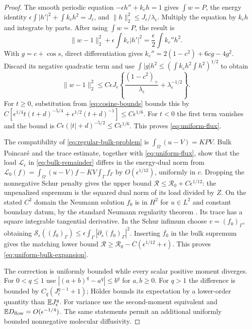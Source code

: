 \begin{proof}
The smooth periodic equation $-\epsilon h''+k_ch=1$ gives
$\int w=P$, the energy identity
$\epsilon\int|h'|^2+\int k_ch^2=J_\epsilon$, and
$\|h\|_2^2\le J_\epsilon/\lambda_\epsilon$.
Multiply the equation by $k_ch$ and integrate by parts. After using
$\int w=P$, the result is
\begin{equation}\label{eq:flux-identity}
 \|w-1\|_2^2+\epsilon\int k_c|h'|^2
                  =\frac\epsilon2\int k_c''h^2.
\end{equation}
With $g=c+\cos s$, direct differentiation gives
$k_c''=2(1-c^2)+6cg-4g^2$.
Discard its negative quadratic term and use
$\int|g|h^2\le(\int k_ch^2\int h^2)^{1/2}$ to obtain
\[
 \|w-1\|_2^2\le C\epsilon J_\epsilon
    \left\{\frac{(1-c^2)_+}{\lambda_\epsilon}
                                +\lambda_\epsilon^{-1/2}\right\}.
\]
For $t\ge0$, substitution from \eqref{eq:cosine-bounds} bounds this by
$C[\epsilon^{1/4}t(t+d)^{-5/4}+\epsilon^{1/2}(t+d)^{-1}]
\le C\epsilon^{1/6}$. For $t<0$ the first term vanishes and the
bound is $C\epsilon(|t|+d)^{-5/2}\le C\epsilon^{1/6}$.
This proves \eqref{eq:uniform-flux}.

The compatibility of \eqref{eq:regular-bulk-problem} is
$\int_\Omega(u-V)=KPV$. Bulk Poincar\'e and the trace estimate,
together with \eqref{eq:uniform-flux}, show that the load
$\mathcal L_\epsilon$ in \eqref{eq:bulk-remainder} differs in the
energy-dual norm from
$\mathcal L_0(f)=\int_\Omega(u-V)f-KV\int_\Gamma f_\Gamma$
by $O(\epsilon^{1/12})$, uniformly in $c$.
Dropping the nonnegative Schur penalty gives the upper bound
$\mathcal R\le\mathcal R_0+C\epsilon^{1/12}$: the unpenalized
supremum is the squared dual norm of its load divided by $Z$.
On the stated $C^2$ domain the Neumann solution $f_0$ is in $H^2$
for $u\in L^2$ and constant boundary datum, by the standard Neumann
regularity theorem \citep[Section~2.4]{Grisvard2011}. Its trace has a square
integrable tangential derivative. In the Schur infimum choose
$v=(f_0)_\Gamma$, obtaining
$\mathcal S_\epsilon((f_0)_\Gamma)
 \le\epsilon\int_\Gamma|\partial_s(f_0)_\Gamma|^2$.
Inserting $f_0$ in the bulk supremum gives the matching lower bound
$\mathcal R\ge\mathcal R_0-C(\epsilon^{1/12}+\epsilon)$.
This proves \eqref{eq:uniform-bulk-expansion}.

The correction is uniformly bounded while every scalar positive moment
diverges. For $0<q\le1$ use $|(a+b)^q-a^q|\le b^q$ for $a,b\ge0$.
For $q>1$ the difference is bounded by $C_q(J_\epsilon^{q-1}+1)$;
H\"older bounds its expectation by a lower-order quantity than
$\mathbb E J_\epsilon^q$. For variance use the second-moment equivalent and
$\mathbb E D_{\mathrm{flow}}=O(\epsilon^{-1/4})$. The same statements permit an
additional uniformly bounded nonnegative molecular diffusivity.
\end{proof}

